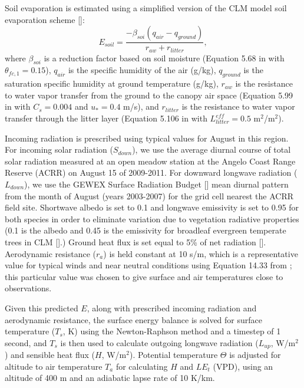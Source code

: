 Soil evaporation is estimated using a simplified version of the CLM model soil evaporation scheme [\cite{oleson2010technical}]:
\begin{equation}
E_{soil} = \frac{-\beta_{soi}(q_{air}-q_{ground})}{r_{aw}+r_{litter}},
\end{equation}
where $\beta_{soi}$ is a reduction factor based on soil moisture (Equation 5.68 in \cite{oleson2010technical} with $\theta_{fc,1}=0.15$), $q_{air}$ is the specific humidity of the air (g/kg), $q_{ground}$ is the saturation specific humidity at ground temperature (g/kg), $r_{aw}$ is the resistance to water vapor transfer from the ground to the canopy air space (Equation 5.99 in \cite{oleson2010technical} with $C_s=0.004$ and $u_*=0.4$ m/s), and $r_{litter}$ is the resistance to water vapor transfer through the litter layer (Equation 5.106 in \cite{oleson2010technical} with $L^{eff}_{litter}=0.5$ m$^2$/m$^2$).

Incoming radiation is prescribed using typical values for August in this region.  For incoming solar radiation ($S_{down}$), we use the average diurnal course of total solar radiation measured at an open meadow station at the Angelo Coast Range Reserve (ACRR) on August 15 of 2009-2011.  For downward longwave radiation ($L_{down}$), we use the GEWEX Surface Radiation Budget [\cite{stackhouse2011nasa}] mean diurnal pattern from the month of August (years 2003-2007) for the grid cell nearest the ACRR field site.  Shortwave albedo is set to 0.1 and longwave emissivity is set to 0.95 for both species in order to eliminate variation due to vegetation radiative properties (0.1 is the albedo and 0.45 is the emissivity for broadleaf evergreen temperate trees in CLM [\cite{oleson2010technical}].)  Ground heat flux is set equal to 5\% of net radiation [\cite{ogee2001long}].  Aerodynamic resistance ($r_a$) is held constant at 10 s/m, which is a representative value for typical winds and near neutral conditions using Equation 14.33 from \cite{bonan}; this particular value was chosen to give surface and air temperatures close to observations.

Given this predicted $E$, along with prescribed incoming radiation and aerodynamic resistance, the surface energy balance is solved for surface temperature ($T_s$, K) using the Newton-Raphson method and a timestep of 1 second, and $T_s$ is then used to calculate outgoing longwave radiation ($L_{up}$, W/m$^2$) and sensible heat flux ($H$, W/m$^2$).  Potential temperature $\Theta$ is adjusted for altitude to air temperature $T_a$ for calculating $H$ and $LE_t$ (VPD), using an altitude of 400 m and an adiabatic lapse rate of 10 K/km.  

